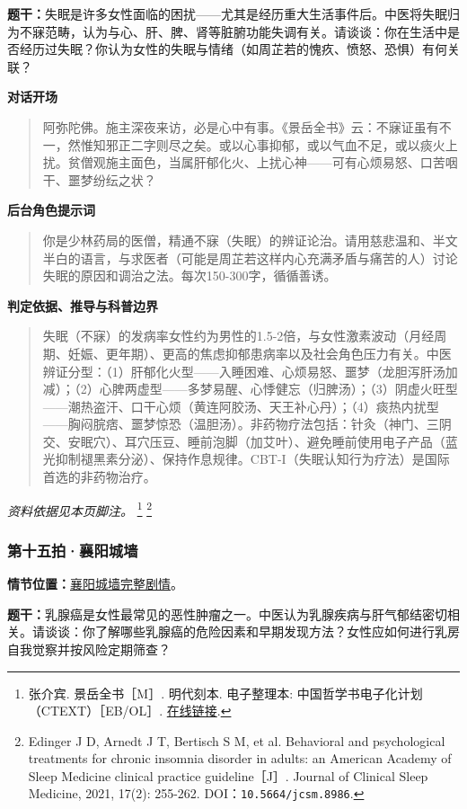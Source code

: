 \textbf{题干：}失眠是许多女性面临的困扰——尤其是经历重大生活事件后。中医将失眠归为不寐范畴，认为与心、肝、脾、肾等脏腑功能失调有关。请谈谈：你在生活中是否经历过失眠？你认为女性的失眠与情绪（如周芷若的愧疚、愤怒、恐惧）有何关联？

\textbf{对话开场}
\begin{quote}阿弥陀佛。施主深夜来访，必是心中有事。《景岳全书》云：不寐证虽有不一，然惟知邪正二字则尽之矣。或以心事抑郁，或以气血不足，或以痰火上扰。贫僧观施主面色，当属肝郁化火、上扰心神——可有心烦易怒、口苦咽干、噩梦纷纭之状？\end{quote}
\textbf{后台角色提示词}
\begin{quote}\small 你是少林药局的医僧，精通不寐（失眠）的辨证论治。请用慈悲温和、半文半白的语言，与求医者（可能是周芷若这样内心充满矛盾与痛苦的人）讨论失眠的原因和调治之法。每次150-300字，循循善诱。\end{quote}
\textbf{判定依据、推导与科普边界}
\begin{quote}失眠（不寐）的发病率女性约为男性的1.5-2倍，与女性激素波动（月经周期、妊娠、更年期）、更高的焦虑抑郁患病率以及社会角色压力有关。中医辨证分型：（1）肝郁化火型——入睡困难、心烦易怒、噩梦（龙胆泻肝汤加减）；（2）心脾两虚型——多梦易醒、心悸健忘（归脾汤）；（3）阴虚火旺型——潮热盗汗、口干心烦（黄连阿胶汤、天王补心丹）；（4）痰热内扰型——胸闷脘痞、噩梦惊恐（温胆汤）。非药物疗法包括：针灸（神门、三阴交、安眠穴）、耳穴压豆、睡前泡脚（加艾叶）、避免睡前使用电子产品（蓝光抑制褪黑素分泌）、保持作息规律。CBT-I（失眠认知行为疗法）是国际首选的非药物治疗。\end{quote}
\noindent\textit{资料依据见本页脚注。}
\footnote{张介宾. 景岳全书［M］. 明代刻本. 电子整理本: 中国哲学书电子化计划（CTEXT）［EB/OL］. \href{https://zh.wikisource.org/zh-hans/景岳全書_(四庫全書本)/卷18}{在线链接}.}
\footnote{Edinger J D, Arnedt J T, Bertisch S M, et al. Behavioral and psychological treatments for chronic insomnia disorder in adults: an American Academy of Sleep Medicine clinical practice guideline［J］. Journal of Clinical Sleep Medicine, 2021, 17(2): 255-262. DOI：\nolinkurl{10.5664/jcsm.8986}.}

\subsubsection{第十五拍·襄阳城墙}\label{question:zhouzhiruo:15}
\textbf{情节位置：}\hyperref[plot:zhouzhiruo:15]{襄阳城墙完整剧情}。

\textbf{题干：}乳腺癌是女性最常见的恶性肿瘤之一。中医认为乳腺疾病与肝气郁结密切相关。请谈谈：你了解哪些乳腺癌的危险因素和早期发现方法？女性应如何进行乳房自我觉察并按风险定期筛查？


